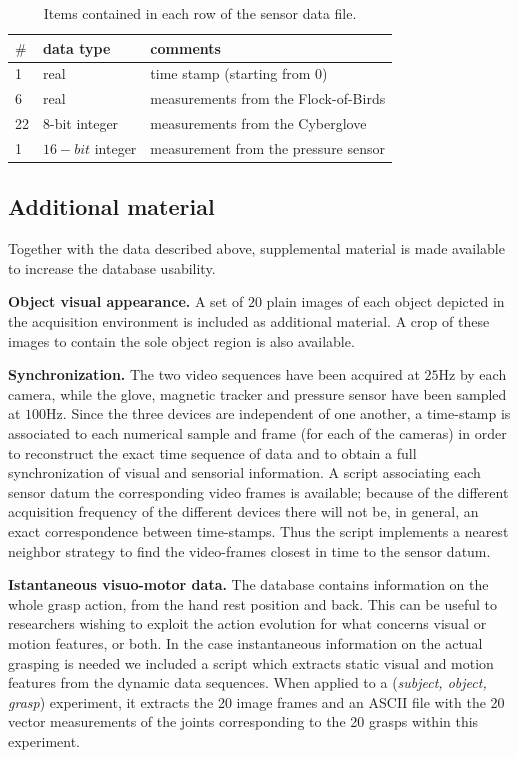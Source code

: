 \documentclass{article}
\begin{document}
\begin{table} \centering
 \label{tab:motordata}
 \caption{Items contained in each row of the sensor data file.}
 \begin{tabular}{|l|l|l|}
   \hline 
   {\bf $\#$} &     {\bf data type} & {\bf comments}                       \\
   \hline 
            1 &             real & time stamp (starting from $0$)       \\
            6 &             real & measurements from the Flock-of-Birds \\
           22 &  $8$-bit integer & measurements from the Cyberglove     \\
            1 & $16-bit$ integer & measurement from the pressure sensor \\
   \hline
 \end{tabular}
\end{table}

\subsection{Additional material}

Together with the data described above, supplemental material is made
available to increase the database usability.

{\bf Object visual appearance.} A set of $20$ plain images of each object
depicted in the acquisition environment is included as additional material. 
A crop of these images to contain the sole object region is also available.

{\bf Synchronization.} The two video sequences have been acquired at $25$Hz by each camera, while the glove,
magnetic tracker and pressure sensor have been sampled at $100$Hz. Since the three
devices are independent of one another, a time-stamp is associated to each numerical
sample and frame (for each of the cameras) in order to reconstruct the exact time
sequence of data and to obtain a full synchronization of visual and sensorial information.
A script associating each sensor datum the corresponding video frames is available; because of the different acquisition frequency of the different
devices there will not be, in general, an exact correspondence between time-stamps. Thus the script implements a nearest
neighbor strategy to find the video-frames closest in time to the sensor datum.

{\bf Istantaneous visuo-motor data.} The database contains information on the whole grasp action, from the hand rest position and back. 
This can be useful to researchers wishing to
exploit the action evolution for what concerns visual or motion features, or both. In the case instantaneous information on the actual grasping 
is needed we included a script 
which extracts static visual and motion features from the dynamic data sequences. When
applied to a ({\em subject, object, grasp}) experiment, it extracts the 20 image frames  and an ASCII file with the 20 vector measurements of the joints 
corresponding to the 20 grasps within this experiment.
\end{document}
